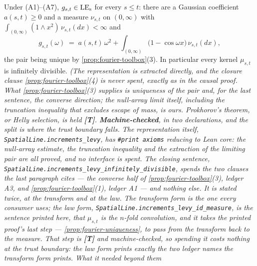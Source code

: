 \begin{theorem}\label{thm:increments-levy}
\leanok
{}
Under (A1)--(A7), $g_{s,t} \in \mathrm{LE}_{\mathrm{s}}$ for every $s \le t$: there are a Gaussian coefficient
$a(s,t) \ge 0$ and a measure $\nu_{s,t}$ on $(0,\infty)$ with
$\int_{(0,\infty)}(1 \wedge x^2)\,\nu_{s,t}(dx) < \infty$ and
\begin{equation}\label{eq:increment-levy}
  g_{s,t}(\omega) \;=\; a(s,t)\,\omega^2
   + \int_{(0,\infty)} \bigl(1 - \cos\omega x\bigr)\,\nu_{s,t}(dx),
\end{equation}
the pair being unique by \ref{prop:fourier-toolbox}(3). In particular every kernel
$\mu_{s,t}$ is infinitely divisible.
\statusT\quad\emph{(The representation is extracted directly, and the closure clause
\ref{prop:fourier-toolbox}(4) is never spent, exactly as in the causal proof. What
\ref{prop:fourier-toolbox}(3) supplies is uniqueness of the pair and, for the last sentence,
the converse direction; the null-array limit itself, including the truncation inequality that
excludes escape of mass, is ours. Prokhorov's theorem, or Helly selection, is held
\textbf{[T]}. \textbf{Machine-checked}, in two declarations, and the split is where the trust
boundary falls. The representation itself, \texttt{SpatialLine.increments\_levy}, has
\texttt{\#print axioms} reducing to \emph{Lean core}: the null-array estimate, the truncation
inequality and the extraction of the limiting pair are all proved, and no interface is spent.
The closing sentence, \texttt{SpatialLine.increments\_levy\_infinitely\_divisible}, spends the
two clauses the last paragraph cites --- the converse half of \ref{prop:fourier-toolbox}(3),
ledger A3, and \ref{prop:fourier-toolbox}(1), ledger A1 --- and nothing else. It is stated
twice, at the transform and at the law. The transform form is the one every consumer uses; the
law form, \texttt{SpatialLine.increments\_levy\_id\_measure}, is the sentence printed here, that
$\mu_{s,t}$ \emph{is} the $n$-fold convolution, and it takes the printed proof's last step ---
\ref{prop:fourier-uniqueness}, to pass from the transform back to the measure. That step is
\textbf{[T]} and machine-checked, so spending it costs nothing at the trust boundary: the law
form prints exactly the two ledger names the transform form prints. What it needed beyond them
}
\end{theorem}

